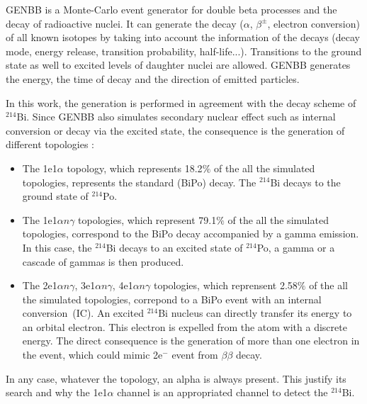 \documentclass[main.tex]{subfiles}
\begin{document}
\bigskip


\noindent GENBB is a Monte-Carlo event generator for double beta processes and the decay of radioactive nuclei. It can generate the decay ($\alpha$, $\beta^\pm$, electron conversion) of all known isotopes by taking into account the information of the decays (decay mode, energy release, transition probability, half-life...). Transitions to the ground state as well to excited levels of daughter nuclei are allowed. GENBB generates the energy, the time of decay and the direction of emitted particles.


\bigskip 


\noindent In this work, the generation is performed in agreement with the decay scheme of $^{\text{214}}$Bi. Since GENBB also simulates secondary nuclear effect such as internal conversion or decay via the excited state, the consequence is the generation of different topologies :


\begin{itemize}
\item The 1e1$\alpha$ topology, which represents 18.2$\%$ of the all the simulated topologies, represents the standard (BiPo) decay. The $^{\text{214}}$Bi decays to the ground state of $^{\text{214}}$Po.


\item The 1e1$\alpha n\gamma$ topologies, which represent 79.1$\%$ of the all the simulated topologies, correspond to the BiPo decay accompanied by a gamma emission. In this case, the $^{\text{214}}$Bi decays to an excited state of $^{\text{214}}$Po, a gamma or a cascade of gammas is then produced.


\item The 2e1$\alpha n\gamma$, 3e1$\alpha n\gamma$, 4e1$\alpha n\gamma$ topologies, which reprensent 2.58$\%$ of the all the simulated topologies, correpond to a BiPo event with an internal conversion~(IC). An excited $^{\text{214}}$Bi nucleus can directly transfer its energy to an orbital electron. This electron is expelled from the atom with a discrete energy. The direct consequence is the generation of more than one electron in the event, which could mimic 2e$^-$ event from $\beta\beta$ decay.


\end{itemize}


\noindent In any case, whatever the topology, an alpha is always present. This justify its search and why the 1e1$\alpha$ channel is an appropriated channel to detect the $^{\text{214}}$Bi.
\end{document}
